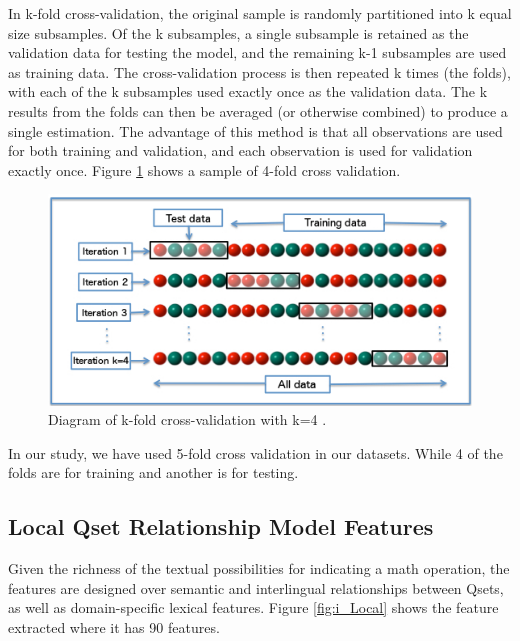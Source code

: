 \documentclass[document.tex]{subfiles}
\begin{document}
In k-fold cross-validation, the original sample is randomly partitioned into k equal size subsamples. Of the k subsamples, a single subsample is retained as the validation data for testing the model, and the remaining k-1 subsamples are used as training data. The cross-validation process is then repeated k times (the folds), with each of the k subsamples used exactly once as the validation data. The k results from the folds can then be averaged (or otherwise combined) to produce a single estimation. The advantage of this method is that all observations are used for both training and validation, and each observation is used for validation exactly once. Figure \ref{fig:kfold} shows a sample of 4-fold cross validation. 
\begin{figure}[H]
	\begin{center}
		
		\includegraphics[scale=0.655]{imgs/K-fold_cross_validation_EN.jpg}
	\end{center}
	
	\caption{Diagram of k-fold cross-validation with k=4 .\cite{kfoldimage}}
	\label{fig:kfold}
\end{figure}

In our study, we have used 5-fold cross validation in our datasets. While 4 of the folds are for training and another is for testing.

\subsection{Local Qset Relationship Model Features}
Given the richness of the textual possibilities for indicating a math operation, the features are designed over semantic and interlingual relationships between Qsets, as well as domain-specific lexical features. Figure \ref{fig:i_Local} shows the feature extracted where it has 90 features.
\end{document}
